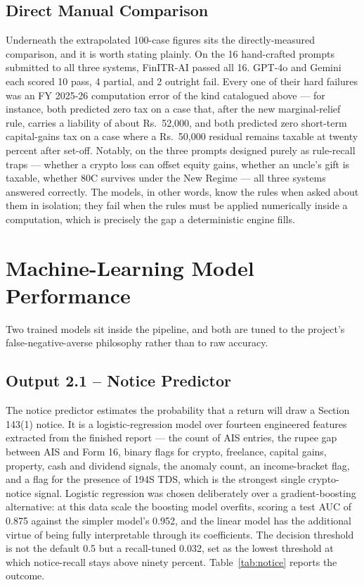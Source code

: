 \documentclass[12pt, a4paper, oneside]{report}
\begin{document}
\subsection{Direct Manual Comparison}
Underneath the extrapolated 100-case figures sits the directly-measured
comparison, and it is worth stating plainly. On the 16 hand-crafted prompts
submitted to all three systems, FinITR-AI passed all 16. GPT-4o and Gemini each
scored 10 pass, 4 partial, and 2 outright fail. Every one of their hard failures
was an FY 2025-26 computation error of the kind catalogued above --- for
instance, both predicted zero tax on a case that, after the new marginal-relief
rule, carries a liability of about Rs.~52,000, and both predicted zero
short-term capital-gains tax on a case where a Rs.~50,000 residual remains
taxable at twenty percent after set-off. Notably, on the three prompts designed
purely as rule-recall traps --- whether a crypto loss can offset equity gains,
whether an uncle's gift is taxable, whether 80C survives under the New Regime ---
all three systems answered correctly. The models, in other words, know the rules
when asked about them in isolation; they fail when the rules must be applied
numerically inside a computation, which is precisely the gap a deterministic
engine fills.

\section{Machine-Learning Model Performance}
\label{sec:result-set-2}

Two trained models sit inside the pipeline, and both are tuned to the project's
false-negative-averse philosophy rather than to raw accuracy.

\subsection{Output 2.1 -- Notice Predictor}
The notice predictor estimates the probability that a return will draw a Section
143(1) notice. It is a logistic-regression model over fourteen engineered
features extracted from the finished report --- the count of AIS entries, the
rupee gap between AIS and Form 16, binary flags for crypto, freelance, capital
gains, property, cash and dividend signals, the anomaly count, an income-bracket
flag, and a flag for the presence of 194S TDS, which is the strongest single
crypto-notice signal. Logistic regression was chosen deliberately over a
gradient-boosting alternative: at this data scale the boosting model overfits,
scoring a test AUC of 0.875 against the simpler model's 0.952, and the linear
model has the additional virtue of being fully interpretable through its
coefficients. The decision threshold is not the default 0.5 but a recall-tuned
0.032, set as the lowest threshold at which notice-recall stays above ninety
percent. Table~\ref{tab:notice} reports the outcome.
\end{document}
